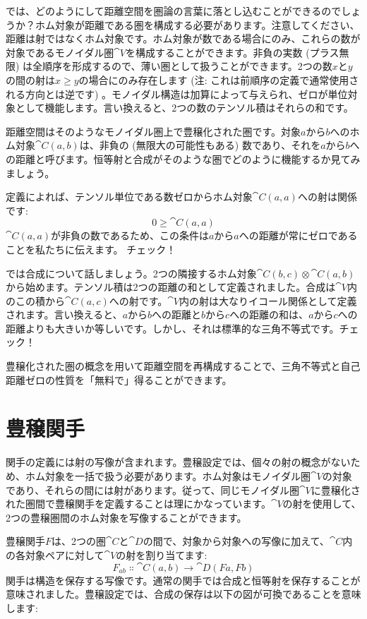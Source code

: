 では、どのようにして距離空間を圏論の言葉に落とし込むことができるのでしょうか？ホム対象が距離である圏を構成する必要があります。注意してください、距離は射ではなくホム対象です。ホム対象が数である場合にのみ、これらの数が対象であるモノイダル圏$\cat{V}$を構成することができます。非負の実数 (プラス無限) は全順序を形成するので、薄い圏として扱うことができます。2つの数$x$と$y$の間の射は$x \geqslant y$の場合にのみ存在します (注: これは前順序の定義で通常使用される方向とは逆です) 。モノイダル構造は加算によって与えられ、ゼロが単位対象として機能します。言い換えると、2つの数のテンソル積はそれらの和です。

距離空間はそのようなモノイダル圏上で豊穣化された圏です。対象$a$から$b$へのホム対象$\cat{C}(a, b)$は、非負の (無限大の可能性もある) 数であり、それを$a$から$b$への距離と呼びます。恒等射と合成がそのような圏でどのように機能するか見てみましょう。

定義によれば、テンソル単位である数ゼロからホム対象$\cat{C}(a, a)$への射は関係です: 
\[0 \geqslant \cat{C}(a, a)\]
$\cat{C}(a, a)$が非負の数であるため、この条件は$a$から$a$への距離が常にゼロであることを私たちに伝えます。
チェック！

では合成について話しましょう。2つの隣接するホム対象$\cat{C}(b, c) \otimes \cat{C}(a, b)$から始めます。テンソル積は2つの距離の和として定義されました。合成は$\cat{V}$内のこの積から$\cat{C}(a, c)$への射です。$\cat{V}$内の射は大なりイコール関係として定義されます。言い換えると、$a$から$b$への距離と$b$から$c$への距離の和は、$a$から$c$への距離よりも大きいか等しいです。しかし、それは標準的な三角不等式です。チェック！

豊穣化された圏の概念を用いて距離空間を再構成することで、三角不等式と自己距離ゼロの性質を「無料で」得ることができます。

\section{豊穣関手}

関手の定義には射の写像が含まれます。豊穣設定では、個々の射の概念がないため、ホム対象を一括で扱う必要があります。ホム対象はモノイダル圏$\cat{V}$の対象であり、それらの間には射があります。従って、同じモノイダル圏$\cat{V}$に豊穣化された圏間で豊穣関手を定義することは理にかなっています。$\cat{V}$の射を使用して、2つの豊穣圏間のホム対象を写像することができます。

豊穣関手$F$は、2つの圏$\cat{C}$と$\cat{D}$の間で、対象から対象への写像に加えて、$\cat{C}$内の各対象ペアに対して$\cat{V}$の射を割り当てます: 
\[F_{a b} \Colon \cat{C}(a, b) \to \cat{D}(F a, F b)\]
関手は構造を保存する写像です。通常の関手では合成と恒等射を保存することが意味されました。豊穣設定では、合成の保存は以下の図が可換であることを意味します: 

